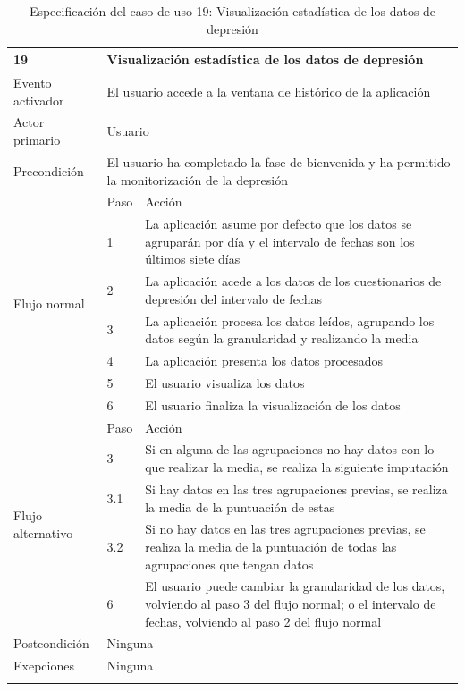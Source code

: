     \begin{table}[h]
        \centering
        \begin{tabularx}{\textwidth}{|l|l|X|}
            \hline
            19 & \multicolumn{2}{|X|}{Visualización estadística de los datos de depresión} \\
            \hline
            Evento activador & \multicolumn{2}{|X|}{El usuario accede a la ventana de histórico de la aplicación} \\
            \hline
            Actor primario & \multicolumn{2}{|X|}{Usuario} \\
            \hline
            Precondición & \multicolumn{2}{|X|}{El usuario ha completado la fase de bienvenida y ha permitido la monitorización de la depresión} \\
            \hline
            \multirow{7}{*}{Flujo normal} & Paso & Acción \\
            \cline{2-3} & 1 & La aplicación asume por defecto que los datos se agruparán por día y el intervalo de fechas son los últimos siete días \\
            \cline{2-3} & 2 & La aplicación acede a los datos de los cuestionarios de depresión del intervalo de fechas \\
            \cline{2-3} & 3 & La aplicación procesa los datos leídos, agrupando los datos según la granularidad y realizando la media \\
            \cline{2-3} & 4 & La aplicación presenta los datos procesados \\
            \cline{2-3} & 5 & El usuario visualiza los datos \\
            \cline{2-3} & 6 & El usuario finaliza la visualización de los datos \\
            \hline
            \multirow{5}{*}{Flujo alternativo} & Paso & Acción \\
            \cline{2-3} & 3 & Si en alguna de las agrupaciones no hay datos con lo que realizar la media, se realiza la siguiente imputación \\
            \cline{2-3} & 3.1 & Si hay datos en las tres agrupaciones previas, se realiza la media de la puntuación de estas \\
            \cline{2-3} & 3.2 & Si no hay datos en las tres agrupaciones previas, se realiza la media de la puntuación de todas las agrupaciones que tengan datos \\
            \cline{2-3} & 6 & El usuario puede cambiar la granularidad de los datos, volviendo al paso 3 del flujo normal; o el intervalo de fechas, volviendo al paso 2 del flujo normal \\
            \hline
            Postcondición & \multicolumn{2}{|X|}{Ninguna} \\
            \hline
            Exepciones & \multicolumn{2}{|X|}{Ninguna} \\
            \hline
            \caption{Especificación del caso de uso 19: Visualización estadística de los datos de depresión}
            \label{tabla:casos_uso:visualizacion_estadistica_depresion}
        \end{tabularx}
    \end{table}

